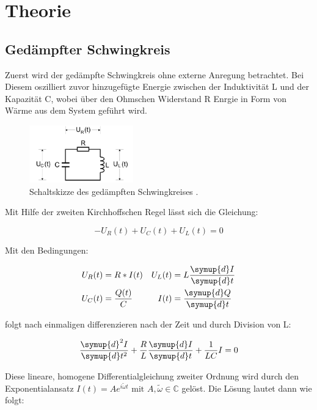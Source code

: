 \section{Theorie}
\label{sec:Theorie}

\subsection{Gedämpfter Schwingkreis}
\label{sec:Theorie_1}

Zuerst wird der gedämpfte Schwingkreis ohne externe Anregung betrachtet. 
Bei Diesem oszilliert zuvor hinzugefügte Energie zwischen der Induktivität L und der Kapazität C,
wobei über den Ohmschen Widerstand R Enrgie in Form von Wärme aus dem System geführt wird.

\begin{figure}
	\centering
    \includegraphics[width=0.4\textwidth]{content/RLC.pdf}
	\caption{Schaltskizze des gedämpften Schwingkreises \cite{v354}.}
	\label{fig:RLC}
\end{figure}

Mit Hilfe der zweiten Kirchhoffschen Regel lässt sich die Gleichung:

\begin{equation}-
    \label{eqn:RLC1}
    U_R(t) + U_C(t) + U_L(t) = 0
\end{equation}

Mit den Bedingungen:

\begin{align}
    \label{eqn:RLC_relations}
        U_R(t) &= R*I(t) & U_L(t) &= L \frac{\symup{d}I}{\symup{d}t} \nonumber \\
        U_C(t) &= \frac{Q(t)}{C} & I(t) &= \frac{\symup{d}Q}{\symup{d}t} 
\end{align}

folgt nach einmaligen differenzieren nach der Zeit und durch Division von L:

\begin{equation}
    \label{eqn:RLC_dgl}
    \frac{\symup{d}^{2}I}{\symup{d}t^2} + \frac{R}{L}\frac{\symup{d}I}{\symup{d}t} + \frac{1}{LC}I = 0   
\end{equation}

Diese lineare, homogene Differentialgleichung zweiter Ordnung wird durch den Exponentialansatz 
$I(t) = A e^{i\tilde{\omega} t} \text{ mit } A, \tilde{\omega} \in \mathbb{C}$ gelöst. Die Lösung lautet dann wie folgt:

